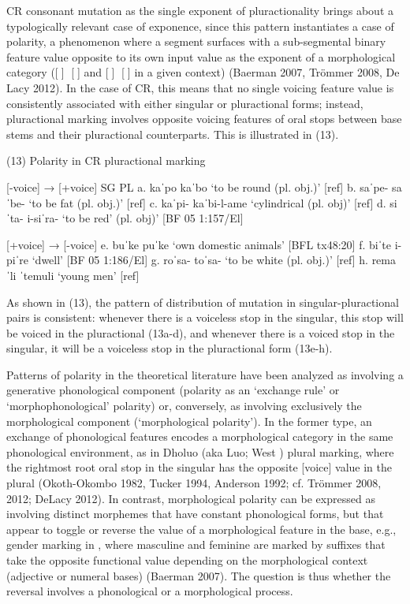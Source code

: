 CR consonant mutation as the single exponent of pluractionality brings about a typologically relevant case of exponence, since this pattern instantiates a case of polarity, a phenomenon where a segment surfaces with a sub-segmental binary feature value opposite to its own input value as the exponent of a morphological category ([] [] and [] [] in a given context) (Baerman 2007, Trömmer 2008, De Lacy 2012). In the case of CR, this means that no single voicing feature value is consistently associated with either singular or pluractional forms; instead, pluractional marking involves opposite voicing features of oral stops between base stems and their pluractional counterparts. This is illustrated in (13).

(13)	Polarity in CR pluractional marking

	[-voice] → [+voice]
		SG		PL
a.	kaˈpo 	kaˈbo 		‘to be round (pl. obj.)’  				[ref]
b.	saˈpe-	saˈbe-		‘to be fat (pl. obj.)’				[ref]
c.	kaˈpi-	kaˈbi-l-ame	‘cylindrical (pl. obj)’				[ref]
d.	siˈta- 	i-siˈra- 		‘to be red’ (pl. obj)’				[BF 05 1:157/El]

		[+voice] → [-voice]
e.	buˈke	puˈke		‘own domestic animals’	 			[BFL tx48:20]
f.	biˈte	i-piˈre 		‘dwell’						[BF 05 1:186/El]
g.	roˈsa-	toˈsa-		‘to be white (pl. obj.)’				[ref]
h.	remaˈli	ˈtemuli		‘young men’					[ref]

As shown in (13), the pattern of distribution of mutation in singular-pluractional pairs is consistent: whenever there is a voiceless stop in the singular, this stop will be voiced in the pluractional (13a-d), and whenever there is a voiced stop in the singular, it will be a voiceless stop in the pluractional form (13e-h).

Patterns of polarity in the theoretical literature have been analyzed as involving a generative phonological component (polarity as an ‘exchange rule’ or ‘morphophonological’ polarity) or, conversely, as involving exclusively the morphological component (‘morphological polarity’).  In the former type, an exchange of phonological features encodes a morphological category in the same phonological environment, as in Dholuo (aka Luo; West ) plural marking, where the rightmost root oral stop in the singular has the opposite [voice] value in the plural (Okoth-Okombo 1982, Tucker 1994, Anderson 1992; cf. Trömmer 2008, 2012; DeLacy 2012). In contrast, morphological polarity can be expressed as involving distinct morphemes that have constant phonological forms, but that appear to toggle or reverse the value of a morphological feature in the base, e.g., gender marking in , where masculine and feminine are marked by suffixes that take the opposite functional value depending on the morphological context (adjective or numeral bases) (Baerman 2007). The question is thus whether the reversal involves a phonological or a morphological process.

